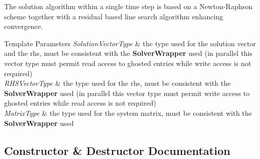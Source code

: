 The solution algorithm within a single time step is based on a Newton-\/\+Raphson scheme together with a residual based line search algorithm enhancing convergence.


\begin{DoxyTemplParams}{Template Parameters}
{\em Solution\+Vector\+Type} & the type used for the solution vector and the rhs, must be consistent with the {\bf Solver\+Wrapper} used (in parallel this vector type must permit read access to ghosted entries while write access is not required)\\
\hline
{\em R\+H\+S\+Vector\+Type} & the type used for the rhs, must be consistent with the {\bf Solver\+Wrapper} used (in parallel this vector type must permit write access to ghosted entries while read access is not required)\\
\hline
{\em Matrix\+Type} & the type used for the system matrix, must be consistent with the {\bf Solver\+Wrapper} used \\
\hline
\end{DoxyTemplParams}


\subsection{Constructor \& Destructor Documentation}
